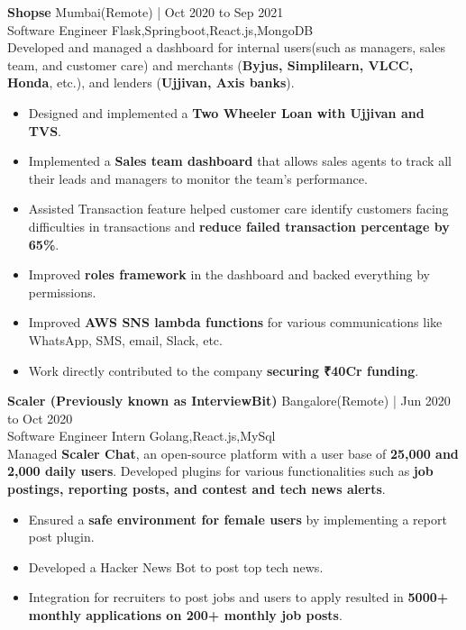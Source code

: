 \documentclass[11pt]{article}
\newcommand{\job}[4]{
    \begingroup
        \textbf{\small#1}
        \hfill\color{black!70}\small{#3}
        \\
        \small#2
        \hfill\color{black!70}\small{#4}
    \endgroup
}
\begin{document}
\begin{paracol}{2}
{      
      \job{Shopse}{Software Engineer}{Mumbai(Remote) | Oct 2020 to Sep 2021}{Flask,Springboot,React.js,MongoDB}{}\\
      \textrm{Developed and managed a dashboard for internal users(such as managers, sales team, and customer care) and merchants (\textbf{Byjus, Simplilearn, VLCC, Honda}, etc.), and lenders (\textbf{Ujjivan, Axis banks}).}
      \begin{itemize}
        \item Designed and implemented a \textbf{Two Wheeler Loan with Ujjivan and TVS}.
        \item Implemented a \textbf{Sales team dashboard} that allows sales agents to track all their leads and managers to monitor the team's performance.
        \item Assisted Transaction feature helped customer care identify customers facing difficulties in transactions and \textbf{reduce failed transaction percentage by 65\%}.
        \item Improved \textbf{roles framework} in the dashboard and backed everything by permissions.
        \item Improved \textbf{AWS SNS lambda functions} for various communications like WhatsApp, SMS, email, Slack, etc.
        \item Work directly contributed to the company \textbf{securing ₹40Cr funding}.
      \end{itemize}
      \vspace{4mm}
      
      \job{Scaler (Previously known as InterviewBit)}{Software Engineer Intern}{Bangalore(Remote) | Jun 2020 to Oct 2020}{Golang,React.js,MySql}{}\\
      \textrm{Managed \textbf{Scaler Chat}, an open-source platform with a user base of \textbf{25,000 and 2,000 daily users}. Developed plugins for various functionalities such as \textbf{job postings, reporting posts, and contest and tech news alerts}.}
      \begin{itemize}
        \item Ensured a \textbf{safe environment for female users} by implementing a report post plugin.
        \item Developed a Hacker News Bot to post top tech news.
        \item Integration for recruiters to post jobs and users to apply resulted in \textbf{5000+ monthly applications on 200+ monthly job posts}.
      \end{itemize}
      \vspace{4mm}

}
\end{paracol}
\end{document}
